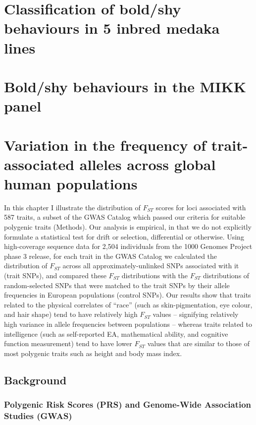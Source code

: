 \documentclass[
  9pt,
]{book}
\begin{document}
\hypertarget{Pilot-chap}{%
\chapter{Classification of bold/shy behaviours in 5 inbred medaka lines}\label{Pilot-chap}}

\hypertarget{MIKK-F2-chap}{%
\chapter{Bold/shy behaviours in the MIKK panel}\label{MIKK-F2-chap}}

\hypertarget{Fst-chap}{%
\chapter{Variation in the frequency of trait-associated alleles across global human populations}\label{Fst-chap}}

In this chapter I illustrate the distribution of \(F_{ST}\) scores for loci associated with 587 traits, a subset of the GWAS Catalog which passed our criteria for suitable polygenic traits (Methods). Our analysis is empirical, in that we do not explicitly formulate a statistical test for drift or selection, differential or otherwise. Using high-coverage sequence data for 2,504 individuals from the 1000 Genomes Project phase 3 release, for each trait in the GWAS Catalog we calculated the distribution of \(F_{ST}\) across all approximately-unlinked SNPs associated with it (trait SNPs), and compared these \(F_{ST}\) distributions with the \(F_{ST}\) distributions of random-selected SNPs that were matched to the trait SNPs by their allele frequencies in European populations (control SNPs). Our results show that traits related to the physical correlates of ``race'' (such as skin-pigmentation, eye colour, and hair shape) tend to have relatively high \(F_{ST}\) values -- signifying relatively high variance in allele frequencies between populations -- whereas traits related to intelligence (such as self-reported EA, mathematical ability, and cognitive function measurement) tend to have lower \(F_{ST}\) values that are similar to those of most polygenic traits such as height and body mass index.

\hypertarget{background}{%
\section{Background}\label{background}}

\hypertarget{polygenic-risk-scores-prs-and-genome-wide-association-studies-gwas}{%
\subsection{Polygenic Risk Scores (PRS) and Genome-Wide Association Studies (GWAS)}\label{polygenic-risk-scores-prs-and-genome-wide-association-studies-gwas}}
\end{document}
